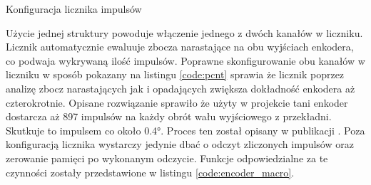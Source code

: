             \begin{kod}
              \inputminted[firstline=5,lastline=48]{cpp}{esp/listings/encoder_driver.cpp}
              \caption{Konfiguracja licznika impulsów}
              \label{code:pcnt}
              \vspace{2em}
            \end{kod} 
            
            Użycie jednej struktury powoduje włączenie jednego z dwóch kanałów w liczniku. Licznik automatycznie ewaluuje zbocza narastające na obu wyjściach enkodera, co podwaja wykrywaną ilość impulsów. Poprawne skonfigurowanie obu kanałów w liczniku w sposób pokazany na listingu \ref{code:pcnt} sprawia że licznik poprzez analizę zbocz narastających jak i opadających zwiększa dokładność enkodera aż czterokrotnie. Opisane rozwiązanie sprawiło że użyty w projekcie tani enkoder dostarcza aż 897 impulsów na każdy obrót wału wyjściowego z przekładni. Skutkuje to impulsem co około 0.4°. Proces ten został opisany w publikacji \cite{enkoder}. Poza konfiguracją licznika wystarczy jedynie dbać o odczyt zliczonych impulsów oraz zerowanie pamięci po wykonanym odczycie. Funkcje odpowiedzialne za te czynności zostały przedstawione w listingu \ref{code:encoder_macro}.